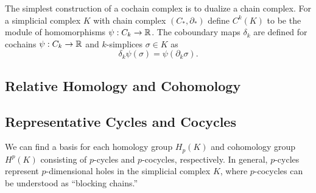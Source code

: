 The simplest construction of a cochain complex is to dualize a chain complex.
For a simplicial complex $K$ with chain complex $(C_*,\partial_*)$ define $C^k(K)$ to be the module of homomorphisms $\psi:C_k\to\mathbb{R}$.
The coboundary maps $\delta_k$ are defined for cochains $\psi:C_k\to\mathbb{R}$ and $k$-simplices $\sigma\in K$ as
\[\delta_k\psi(\sigma) = \psi(\partial_k\sigma).\]


\subsection{Relative Homology and Cohomology}

\subsection{Representative Cycles and Cocycles}

We can find a basis for each homology group $H_p(K)$ and cohomology group $H^p(K)$ consisting of $p$-cycles and $p$-cocycles, respectively.
In general, $p$-cycles represent $p$-dimensional holes in the simplicial complex $K$, where $p$-cocycles can be understood as ``blocking chains.''

